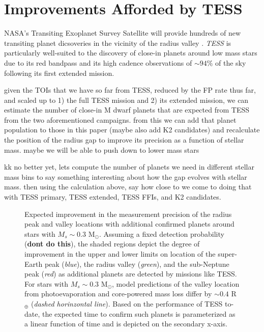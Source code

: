 \documentclass[modern]{aastex63}
\newcommand\tess{\emph{TESS}}
\begin{document}
\section{Improvements Afforded by TESS} \label{sect:tess}
NASA's Transiting Exoplanet Survey Satellite \citep[\tess{;}][]{ricker15} will provide hundreds of new transiting planet
dicsoveries in the vicinity of the radius valley \citep{barclay18}. \tess{} is particularly well-suited to the discovery of
close-in planets around low mass stars due to its red bandpass and its high cadence observations of $\sim 94$\% of the sky
following its first extended mission. 


given the TOIs that we have so far from TESS, reduced by the FP rate thus far, and scaled up to 1) the full TESS mission and 2) its extended mission, 
we can estimate the number of close-in M dwarf planets that are expected from TESS from the two aforementioned campaigns. from this we can add that 
planet population to those in this paper (maybe also add K2 candidates) and recalculate the position of the radius gap to improve its precision as 
a function of stellar mass. maybe we will be able to push down to lower mass stars

kk no better yet, lets compute the number of planets we need in different stellar mass bins to say something interesting about how the gap evolves 
with stellar mass. then using the calculation above, say how close to we come to doing that with TESS primary, TESS extended, TESS FFIs, and K2 
candidates.

\begin{figure}
  \centering
  \caption{Expected improvement in the measurement precision of the radius peak and valley locations with additional
    confirmed planets around stars with $M_s\sim 0.3$ M$_{\odot}$. Assuming a fixed detection probability (\textbf{dont do this}),
    the shaded
    regions depict the degree of improvement in the upper and lower limits on location of the super-Earth peak
    (\emph{blue}), the radius valley (\emph{green}), and the sub-Neptune peak (\emph{red}) as additional planets are
    detected by missions like TESS. For stars with $M_s\sim 0.3$ M$_{\odot}$, model predictions of the valley location
    from photoevaporation and core-powered mass loss differ by $\sim 0.4$ R$_{\oplus}$ (\emph{dashed horinzontal line}).
    Based on the performance of TESS to-date, the expected time to confirm such planets is parameterized as a linear
    function of time and is depicted on the secondary x-axis.}
  \label{fig:improve}
\end{figure}
\end{document}
